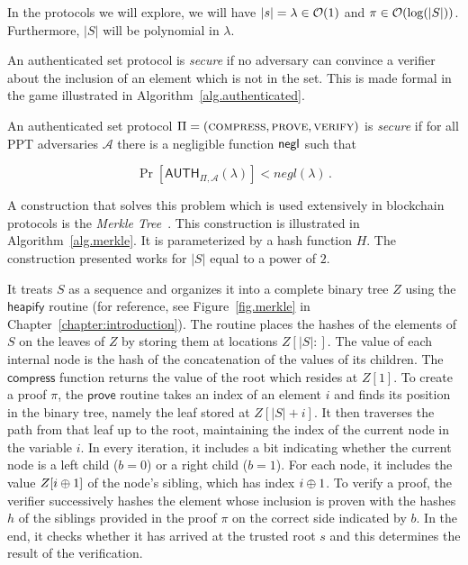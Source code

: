 In the protocols we will explore, we will have $|s| = \lambda \in \mathcal{O}(1)$ and
$\pi \in \mathcal{O}(\log(|S|))$. Furthermore, $|S|$ will be polynomial in $\lambda$.

An authenticated set protocol is \emph{secure} if no adversary can
convince a verifier about the inclusion of an element which is not in the
set. This is made formal in the game illustrated in
Algorithm~\ref{alg.authenticated}.



\begin{definition}[Security]
  An authenticated set protocol $\Pi = (\textsc{compress},\allowbreak \textsc{prove},\allowbreak \textsc{verify})$ is \emph{secure} if for all PPT adversaries $\mathcal{A}$
  there is a negligible function $\mathsf{negl}$ such that

  \[
    \Pr[\textsf{AUTH}_{\Pi,\mathcal{A}}(\lambda)] < negl(\lambda)\,.
  \]
\end{definition}

A construction that solves this problem which is used extensively in blockchain
protocols is the \emph{Merkle Tree}~\cite{merkle}. This construction is
illustrated in Algorithm~\ref{alg.merkle}. It is parameterized by a hash
function $H$. The construction presented works for $|S|$ equal to a power of
$2$.

It treats $S$ as a sequence and organizes it into a complete binary tree $Z$
using the $\textsf{heapify}$ routine (for reference, see Figure~\ref{fig.merkle}
in Chapter~\ref{chapter:introduction}). The routine places the hashes of the
elements of $S$ on the leaves of $Z$ by storing them at locations $Z[|S|{:}]$.
The value of each internal node is the hash of the concatenation of the values
of its children. The $\textsf{compress}$ function returns the value of the root
which resides at $Z[1]$. To create a proof $\pi$, the $\textsf{prove}$ routine
takes an index of an element $i$ and finds its position in the binary tree,
namely the leaf stored at $Z[|S| + i]$. It then traverses the path from that
leaf up to the root, maintaining the index of the current node in the variable
$i$. In every iteration, it includes a bit indicating whether the current node
is a left child ($b = 0$) or a right child ($b = 1$). For each node, it includes
the value $Z[i \oplus 1]$ of the node's sibling, which has index $i \oplus 1$. To
verify a proof, the verifier successively hashes the element whose inclusion is
proven with the hashes $h$ of the siblings provided in the proof $\pi$ on the
correct side indicated by $b$. In the end, it checks whether it has arrived at
the trusted root $s$ and this determines the result of the verification.

